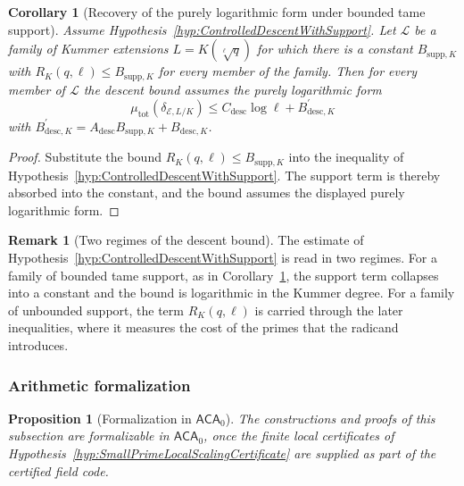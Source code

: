 \documentclass[10pt, reqno]{amsart}
\theoremstyle{plain}
\newtheorem{proposition}[theorem]{Proposition}
\newtheorem{corollary}[theorem]{Corollary}
\theoremstyle{definition}
\newtheorem{remark}[theorem]{Remark}
\theoremstyle{plain}
\begin{document}
\begin{corollary}[Recovery of the purely logarithmic form under bounded tame support]
\label{cor:RecoveryControlledDescentLogCost}
Assume Hypothesis~\ref{hyp:ControlledDescentWithSupport}. Let $\mathcal{L}$ be a family of Kummer extensions $L=K(\sqrt[\ell]{q})$ for which there is a constant $B_{\mathrm{supp},K}$ with $R_{K}(q,\ell)\le B_{\mathrm{supp},K}$ for every member of the family. Then for every member of $\mathcal{L}$ the descent bound assumes the purely logarithmic form
\[
  \mu_{\mathrm{tot}}(\delta_{\mathcal{E},L/K})
  \le
  C_{\mathrm{desc}}\log \ell
  +
  B_{\mathrm{desc},K}^{\prime}
\]
with $B_{\mathrm{desc},K}^{\prime}=A_{\mathrm{desc}}B_{\mathrm{supp},K}+B_{\mathrm{desc},K}$.
\end{corollary}

\begin{proof}
Substitute the bound $R_{K}(q,\ell)\le B_{\mathrm{supp},K}$ into the inequality of Hypothesis~\ref{hyp:ControlledDescentWithSupport}. The support term is thereby absorbed into the constant, and the bound assumes the displayed purely logarithmic form.
\end{proof}

\begin{remark}[Two regimes of the descent bound]\label{rem:DescentRegimes}
The estimate of Hypothesis~\ref{hyp:ControlledDescentWithSupport} is read in two regimes. For a family of bounded tame support, as in Corollary~\ref{cor:RecoveryControlledDescentLogCost}, the support term collapses into a constant and the bound is logarithmic in the Kummer degree. For a family of unbounded support, the term $R_{K}(q,\ell)$ is carried through the later inequalities, where it measures the cost of the primes that the radicand introduces.
\end{remark}

\subsubsection{Arithmetic formalization}\label{subsubsec:ControlledDescentACA}

\begin{proposition}[Formalization in \texorpdfstring{\(\mathsf{ACA}_{0}\)}{ACA0}]
\label{prop:ControlledDescentACAFormalization}
The constructions and proofs of this subsection are formalizable in $\mathsf{ACA}_{0}$, once the finite local certificates of Hypothesis~\ref{hyp:SmallPrimeLocalScalingCertificate} are supplied as part of the certified field code.
\end{proposition}
\end{document}
